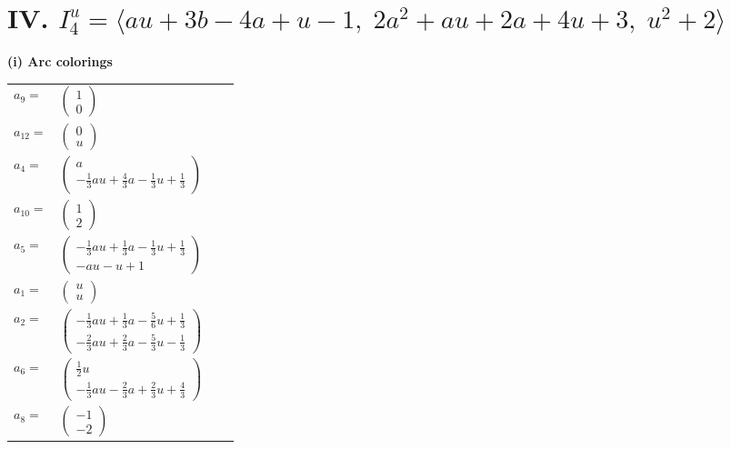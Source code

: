 \documentclass[1p]{elsarticle_modified}
\theoremstyle{definition}
\begin{document}
\centering \section*{IV. $I^u_{4}= \langle a u+3 b-4 a+u-1,\;2 a^2+a u+2 a+4 u+3,\;u^2+2 \rangle$}
\flushleft \textbf{(i) Arc colorings}\\
\begin{tabular}{m{7pt} m{180pt} m{7pt} m{180pt} }
\flushright $a_{9}=$&$\begin{pmatrix}1\\0\end{pmatrix}$ \\
\flushright $a_{12}=$&$\begin{pmatrix}0\\u\end{pmatrix}$ \\
\flushright $a_{4}=$&$\begin{pmatrix}a\\-\frac{1}{3} a u+\frac{4}{3} a-\frac{1}{3} u+\frac{1}{3}\end{pmatrix}$ \\
\flushright $a_{10}=$&$\begin{pmatrix}1\\2\end{pmatrix}$ \\
\flushright $a_{5}=$&$\begin{pmatrix}-\frac{1}{3} a u+\frac{1}{3} a-\frac{1}{3} u+\frac{1}{3}\\- a u- u+1\end{pmatrix}$ \\
\flushright $a_{1}=$&$\begin{pmatrix}u\\u\end{pmatrix}$ \\
\flushright $a_{2}=$&$\begin{pmatrix}-\frac{1}{3} a u+\frac{1}{3} a-\frac{5}{6} u+\frac{1}{3}\\-\frac{2}{3} a u+\frac{2}{3} a-\frac{5}{3} u-\frac{1}{3}\end{pmatrix}$ \\
\flushright $a_{6}=$&$\begin{pmatrix}\frac{1}{2} u\\-\frac{1}{3} a u-\frac{2}{3} a+\frac{2}{3} u+\frac{4}{3}\end{pmatrix}$ \\
\flushright $a_{8}=$&$\begin{pmatrix}-1\\-2\end{pmatrix}$ \\

\end{tabular}
\end{document}
